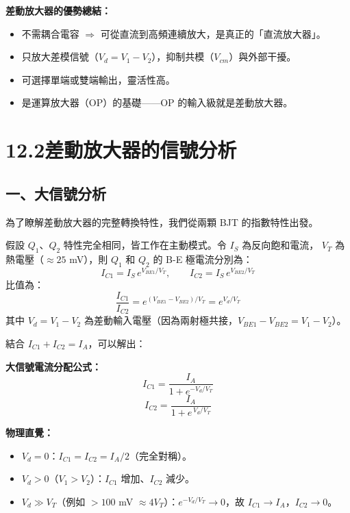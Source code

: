 \documentclass[12pt]{article}
\begin{document}
\medskip
\noindent\textbf{差動放大器的優勢總結：}
\begin{itemize}[leftmargin=2em,itemsep=1pt]
  \item 不需耦合電容 $\Rightarrow$ 可從直流到高頻連續放大，是真正的「直流放大器」。
  \item 只放大差模信號（$V_d = V_1 - V_2$），抑制共模（$V_{cm}$）與外部干擾。
  \item 可選擇單端或雙端輸出，靈活性高。
  \item 是運算放大器（OP）的基礎——OP 的輸入級就是差動放大器。
\end{itemize}

\section*{12.2\quad 差動放大器的信號分析}

\subsection*{一、大信號分析}

為了瞭解差動放大器的完整轉換特性，我們從兩顆 BJT 的指數特性出發。

\begin{keybox}[大信號轉換特性推導]
假設 $Q_1$、$Q_2$ 特性完全相同，皆工作在主動模式。令 $I_S$ 為反向飽和電流，
$V_T$ 為熱電壓（$\approx 25$ mV），則 $Q_1$ 和 $Q_2$ 的 B-E 極電流分別為：
\[
  I_{C1} = I_S\, e^{V_{BE1}/V_T}, \qquad I_{C2} = I_S\, e^{V_{BE2}/V_T}
\]
比值為：
\[
  \frac{I_{C1}}{I_{C2}} = e^{(V_{BE1}-V_{BE2})/V_T} = e^{V_d/V_T}
\]
其中 $V_d = V_1 - V_2$ 為差動輸入電壓（因為兩射極共接，$V_{BE1}-V_{BE2}=V_1-V_2$）。

結合 $I_{C1} + I_{C2} = I_A$，可以解出：
\end{keybox}

\begin{formulabox}
\textbf{大信號電流分配公式：}
\[
  I_{C1} = \frac{I_A}{1 + e^{-V_d/V_T}} \tag{12.5}
\]
\[
  I_{C2} = \frac{I_A}{1 + e^{\,V_d/V_T}} \tag{12.6}
\]
\end{formulabox}

\noindent\textbf{物理直覺：}
\begin{itemize}[leftmargin=2em,itemsep=2pt]
  \item $V_d = 0$：$I_{C1} = I_{C2} = I_A/2$（完全對稱）。
  \item $V_d > 0$（$V_1 > V_2$）：$I_{C1}$ 增加、$I_{C2}$ 減少。
  \item $V_d \gg V_T$（例如 $> 100$ mV $\approx 4V_T$）：$e^{-V_d/V_T} \to 0$，故 $I_{C1} \to I_A$，$I_{C2} \to 0$。
\end{itemize}
\end{document}
